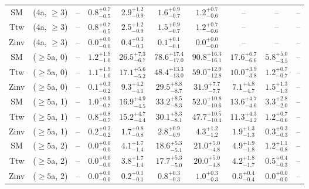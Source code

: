 \begin{table}[h!]
{\begin{tabular}{cccccccccc}
	SM & (4a, $\ge3$) & -- & $0.8^{+ 0.7 }_{- 0.5 }$ & $2.9^{+ 1.2 }_{- 0.9 }$ & $1.6^{+ 0.9 }_{- 0.7 }$ & $1.2^{+ 0.7 }_{- 0.6 }$ & -- & -- & -- \\[0.5ex] 
	Ttw & (4a, $\ge3$) & -- & $0.8^{+ 0.7 }_{- 0.5 }$ & $2.5^{+ 1.2 }_{- 0.9 }$ & $1.5^{+ 0.9 }_{- 0.7 }$ & $1.2^{+ 0.7 }_{- 0.6 }$ & -- & -- & -- \\[0.5ex] 
	Zinv & (4a, $\ge3$) & -- & $0.0^{+ 0.0 }_{- 0.0 }$ & $0.4^{+ 0.3 }_{- 0.3 }$ & $0.1^{+ 0.1 }_{- 0.1 }$ & $0.0^{+ 0.0 }_{- 0.0 }$ & -- & -- & -- \\[0.5ex] 
	SM & ($\ge5$a, 0) & -- & $1.2^{+ 1.9 }_{- 1.0 }$ & $26.5^{+ 7.3 }_{- 6.7 }$ & $78.6^{+ 17.4 }_{- 17.0 }$ & $90.8^{+ 16.3 }_{- 16.1 }$ & $17.6^{+ 6.7 }_{- 6.6 }$ & $5.8^{+ 5.0 }_{- 3.5 }$ & -- \\[0.5ex] 
	Ttw & ($\ge5$a, 0) & -- & $1.1^{+ 1.9 }_{- 1.0 }$ & $17.1^{+ 5.6 }_{- 5.2 }$ & $48.4^{+ 13.3 }_{- 13.0 }$ & $59.0^{+ 12.9 }_{- 12.8 }$ & $10.0^{+ 3.9 }_{- 3.8 }$ & $1.2^{+ 0.7 }_{- 0.7 }$ & -- \\[0.5ex] 
	Zinv & ($\ge5$a, 0) & -- & $0.1^{+ 0.3 }_{- 0.2 }$ & $9.3^{+ 4.2 }_{- 4.1 }$ & $29.5^{+ 8.8 }_{- 8.7 }$ & $31.9^{+ 7.7 }_{- 7.7 }$ & $7.1^{+ 4.8 }_{- 4.7 }$ & $1.5^{+ 1.3 }_{- 1.3 }$ & -- \\[0.5ex] 
	SM & ($\ge5$a, 1) & -- & $1.0^{+ 0.9 }_{- 0.7 }$ & $16.9^{+ 4.9 }_{- 4.5 }$ & $33.2^{+ 8.5 }_{- 8.3 }$ & $52.0^{+ 10.8 }_{- 10.6 }$ & $13.6^{+ 4.7 }_{- 4.6 }$ & $3.3^{+ 2.8 }_{- 2.0 }$ & -- \\[0.5ex] 
	Ttw & ($\ge5$a, 1) & -- & $0.8^{+ 0.8 }_{- 0.7 }$ & $15.2^{+ 4.7 }_{- 4.4 }$ & $30.1^{+ 8.3 }_{- 8.1 }$ & $47.7^{+ 10.5 }_{- 10.4 }$ & $11.3^{+ 4.3 }_{- 4.2 }$ & $1.2^{+ 0.7 }_{- 0.6 }$ & -- \\[0.5ex] 
	Zinv & ($\ge5$a, 1) & -- & $0.2^{+ 0.2 }_{- 0.2 }$ & $1.7^{+ 0.8 }_{- 0.8 }$ & $2.8^{+ 0.9 }_{- 0.9 }$ & $4.3^{+ 1.2 }_{- 1.2 }$ & $1.9^{+ 1.3 }_{- 1.3 }$ & $0.3^{+ 0.3 }_{- 0.3 }$ & -- \\[0.5ex] 
	SM & ($\ge5$a, 2) & -- & $0.0^{+ 0.0 }_{- 0.0 }$ & $4.1^{+ 1.7 }_{- 1.4 }$ & $18.6^{+ 5.3 }_{- 5.1 }$ & $21.0^{+ 5.0 }_{- 4.8 }$ & $4.9^{+ 1.9 }_{- 1.8 }$ & $1.2^{+ 1.1 }_{- 0.8 }$ & -- \\[0.5ex] 
	Ttw & ($\ge5$a, 2) & -- & $0.0^{+ 0.0 }_{- 0.0 }$ & $3.8^{+ 1.7 }_{- 1.4 }$ & $17.7^{+ 5.3 }_{- 5.0 }$ & $20.0^{+ 5.0 }_{- 4.8 }$ & $4.2^{+ 1.8 }_{- 1.7 }$ & $0.5^{+ 0.4 }_{- 0.3 }$ & -- \\[0.5ex] 
	Zinv & ($\ge5$a, 2) & -- & $0.0^{+ 0.0 }_{- 0.0 }$ & $0.2^{+ 0.1 }_{- 0.1 }$ & $0.8^{+ 0.3 }_{- 0.3 }$ & $1.0^{+ 0.3 }_{- 0.3 }$ & $0.5^{+ 0.4 }_{- 0.4 }$ & $0.0^{+ 0.0 }_{- 0.0 }$ & -- \\[0.5ex] 

\end{tabular}}
\end{table}
